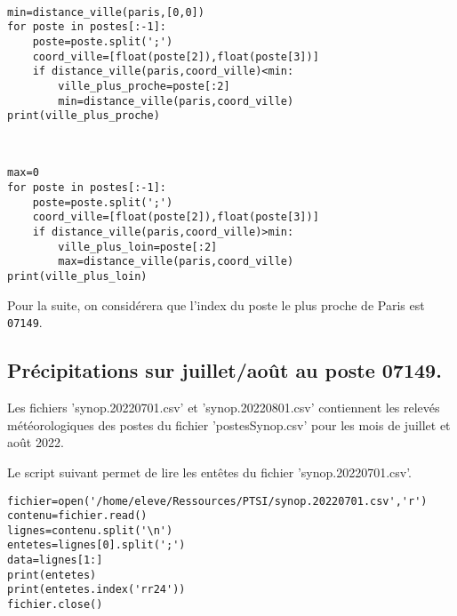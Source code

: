
\begin{solution}~\ \\
\begin{verbatim}
min=distance_ville(paris,[0,0])
for poste in postes[:-1]:
    poste=poste.split(';')
    coord_ville=[float(poste[2]),float(poste[3])]
    if distance_ville(paris,coord_ville)<min:
        ville_plus_proche=poste[:2]
        min=distance_ville(paris,coord_ville)
print(ville_plus_proche)
\end{verbatim}
\end{solution}



\begin{solution}~\ \\
\begin{verbatim}
max=0
for poste in postes[:-1]:
    poste=poste.split(';')
    coord_ville=[float(poste[2]),float(poste[3])]
    if distance_ville(paris,coord_ville)>min:
        ville_plus_loin=poste[:2]
        max=distance_ville(paris,coord_ville)
print(ville_plus_loin)
\end{verbatim}
\end{solution}

Pour la suite, on considérera que l'index du poste le plus proche de Paris est \verb?07149?.

\subsection{Précipitations sur juillet/août au poste 07149.}

Les fichiers 'synop.20220701.csv' et 'synop.20220801.csv' contiennent les relevés météorologiques des postes du fichier 'postesSynop.csv' pour les mois de juillet et août 2022.

Le script suivant permet de lire les entêtes du fichier 'synop.20220701.csv'.

\begin{verbatim}
fichier=open('/home/eleve/Ressources/PTSI/synop.20220701.csv','r')
contenu=fichier.read()
lignes=contenu.split('\n')
entetes=lignes[0].split(';')
data=lignes[1:]
print(entetes)
print(entetes.index('rr24'))
fichier.close()
\end{verbatim}

